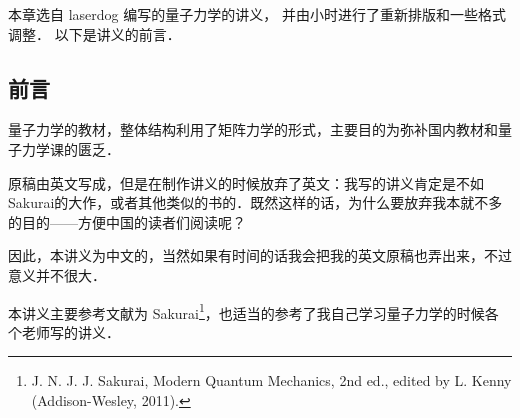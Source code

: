 
本章选自 laserdog 编写的量子力学的讲义，%
并由小时进行了重新排版和一些格式调整． 以下是讲义的前言．

\subsection{前言}

量子力学的教材，整体结构利用了矩阵力学的形式，主要目的为弥补国内教材和量子力学课的匮乏．

原稿由英文写成，但是在制作讲义的时候放弃了英文：我写的讲义肯定是不如Sakurai的大作，或者其他类似的书的．既然这样的话，为什么要放弃我本就不多的目的——方便中国的读者们阅读呢？

因此，本讲义为中文的，当然如果有时间的话我会把我的英文原稿也弄出来，不过意义并不很大．

本讲义主要参考文献为 Sakurai\footnote{J. N. J. J. Sakurai, Modern Quantum Mechanics, 2nd ed., edited by L. Kenny (Addison-Wesley, 2011).}，也适当的参考了我自己学习量子力学的时候各个老师写的讲义．
